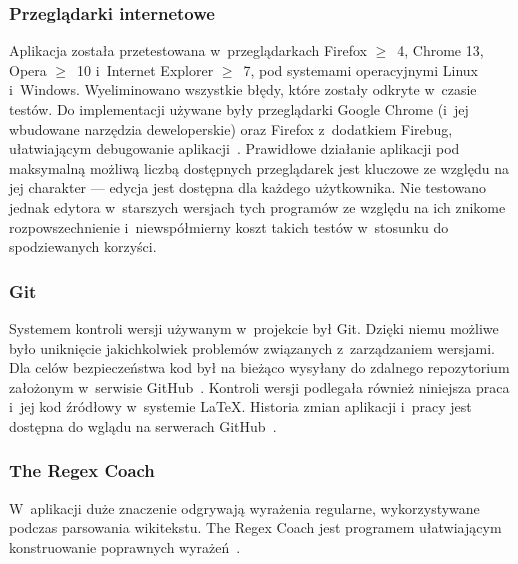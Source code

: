 \subsubsection{Przeglądarki internetowe}
Aplikacja została przetestowana w~przeglądarkach Firefox $\geq$~4, Chrome 13, Opera $\geq$~10 i~Internet Explorer $\geq$~7, pod systemami operacyjnymi Linux i~Windows. Wyeliminowano wszystkie błędy, które zostały odkryte w~czasie testów. Do implementacji używane były przeglądarki Google Chrome (i~jej wbudowane narzędzia deweloperskie) oraz Firefox z~dodatkiem Firebug, ułatwiającym debugowanie aplikacji~\cite{firebug}. Prawidłowe działanie aplikacji pod maksymalną możliwą liczbą dostępnych przeglądarek jest kluczowe ze względu na jej charakter --- edycja jest dostępna dla każdego użytkownika. Nie testowano jednak edytora w~starszych wersjach tych programów ze względu na ich znikome rozpowszechnienie i~niewspółmierny koszt takich testów w~stosunku do spodziewanych korzyści.
\subsubsection{Git}
Systemem kontroli wersji używanym w~projekcie był Git. Dzięki niemu możliwe było uniknięcie jakichkolwiek problemów związanych z~zarządzaniem wersjami. Dla celów bezpieczeństwa kod był na bieżąco wysyłany do zdalnego repozytorium założonym w~serwisie GitHub~\cite{github}. Kontroli wersji podlegała również niniejsza praca i~jej kod źródłowy w~systemie \LaTeX. Historia zmian aplikacji i~pracy jest dostępna do wglądu na serwerach GitHub~\cite{github:wikt}.
\subsubsection{The Regex Coach}
W~aplikacji duże znaczenie odgrywają wyrażenia regularne, wykorzystywane podczas parsowania wikitekstu. The Regex Coach jest programem ułatwiającym konstruowanie poprawnych wyrażeń~\cite{regexcoach}.
\spacer

